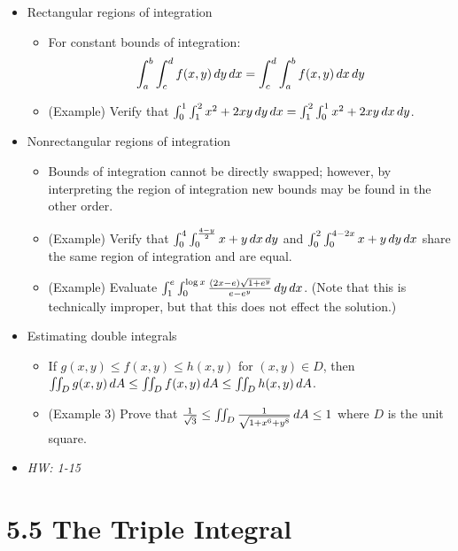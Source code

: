 \documentclass[11pt]{article}
\begin{document}
\begin{itemize}
  \item Rectangular regions of integration
    \begin{itemize}
      \item For constant bounds of integration:
        \[
          \int_a^b\int_c^d f(x,y)\,d y\,d x
            =
          \int_c^d\int_a^b f(x,y)\,d x\,d y
        \]
      \item (Example) Verify that
        \(
          \int_0^1\int_1^2 x^2+2xy\,d y\,d x
            =
          \int_1^2\int_0^1 x^2+2xy\,d x\,d y
        \).
    \end{itemize}
  \item Nonrectangular regions of integration
    \begin{itemize}
      \item Bounds of integration cannot be directly swapped; however, by
      interpreting the region of integration new bounds may be found in
      the other order.
      \item (Example) Verify that
        \(
          \int_0^4\int_0^{\frac{4-y}{2}} x+y \,d x\,d y
        \)
      and
        \(
          \int_0^2\int_0^{4-2x} x+y \,d y\,d x
        \)
      share the same region of integration and are equal.
      \item (Example) Evaluate
        \(
          \int_1^e\int_0^{\log x}\frac{(2x-e)\sqrt{1+e^y}}{e-e^y}\,d y\,d x
        \).
        (Note that this is technically improper, but that this does not effect
        the solution.)
    \end{itemize}
  \item Estimating double integrals
    \begin{itemize}
      \item If \(g(x,y)\leq f(x,y)\leq h(x,y)\) for \((x,y)\in D\), then
      \(\iint_D g(x,y)\,d A\leq\iint_D f(x,y)\,d A\leq \iint_D h(x,y)\,d A\).
      \item (Example 3) Prove that
      \(\frac{1}{\sqrt 3}\leq \iint_D \frac{1}{\sqrt{1+x^6+y^8}}\,d A \leq 1\)
      where \(D\) is the unit square.
    \end{itemize}
  \item\textit{
    HW: 1-15
  }
\end{itemize}

\section*{5.5 The Triple Integral}
\end{document}
